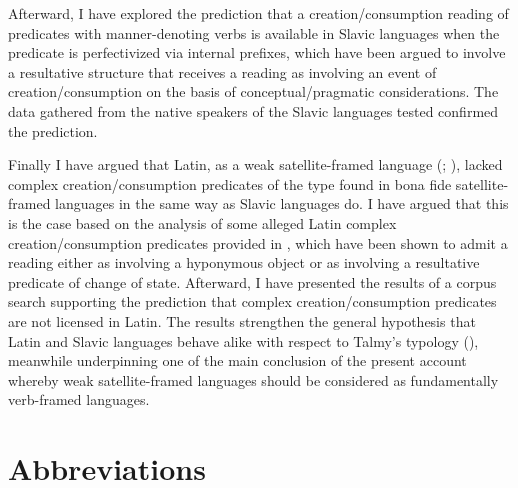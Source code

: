 \documentclass[output=paper,colorlinks,citecolor=brown]{langscibook}
\begin{document}
Afterward, I have explored the prediction that a creation/consumption reading of predicates with manner-denoting verbs is available in Slavic languages when the predicate is perfectivized via internal prefixes, which have been argued to involve a resultative structure that receives a reading as involving an event of creation/consumption on the basis of conceptual/pragmatic considerations. The data gathered from the native speakers of the Slavic languages tested confirmed the prediction.

Finally I have argued that Latin, as a weak satellite-framed language (\citealt{Acedo-Matellan2010}; \citeyear{Acedo-Matellan2016}), lacked complex creation/consumption predicates of the type found in bona fide satellite-framed languages in the same way as Slavic languages do. I have argued that this is the case based on the analysis of some alleged Latin complex creation/consumption predicates provided in \citet{Acedo-Matellan2016}, which have been shown to admit a reading either as involving a hyponymous object or as involving a resultative predicate of change of state. Afterward, I have presented the results of a corpus search supporting the prediction that complex creation/consumption predicates are not licensed in Latin. The results strengthen the general hypothesis that Latin and Slavic languages behave alike with respect to Talmy's typology (\citealt{Acedo-Matellan2016}), meanwhile underpinning one of the main conclusion of the present account whereby weak satellite-framed languages should be considered as fundamentally verb-framed languages.


\section*{Abbreviations}
\end{document}
